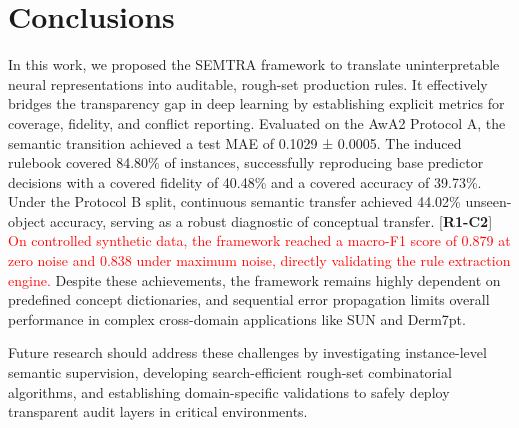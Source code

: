 \documentclass[make,article,submit,pdftex,moreauthors]{Definitions/mdpi}
\newcommand{\revtag}[2]{[\textbf{R#1-C#2}]}
\newcommand{\Rone}[1]{\textcolor{red}{#1}}
\begin{document}
\section{Conclusions}
\label{sec:conclusions}

In this work, we proposed the SEMTRA framework to translate uninterpretable neural representations into auditable, rough-set production rules. It effectively bridges the transparency gap in deep learning by establishing explicit metrics for coverage, fidelity, and conflict reporting. Evaluated on the AwA2 Protocol A, the semantic transition achieved a test MAE of 0.1029 ± 0.0005. The induced rulebook covered 84.80\% of instances, successfully reproducing base predictor decisions with a covered fidelity of 40.48\% and a covered accuracy of 39.73\%. Under the Protocol B split, continuous semantic transfer achieved 44.02\% unseen-object accuracy, serving as a robust diagnostic of conceptual transfer. \revtag{1}{2} \Rone{On controlled synthetic data, the framework reached a macro-F1 score of 0.879 at zero noise and 0.838 under maximum noise, directly validating the rule extraction engine.} Despite these achievements, the framework remains highly dependent on predefined concept dictionaries, and sequential error propagation limits overall performance in complex cross-domain applications like SUN and Derm7pt.

Future research should address these challenges by investigating instance-level semantic supervision, developing search-efficient rough-set combinatorial algorithms, and establishing domain-specific validations to safely deploy transparent audit layers in critical environments.

\vspace{6pt}

\end{document}
